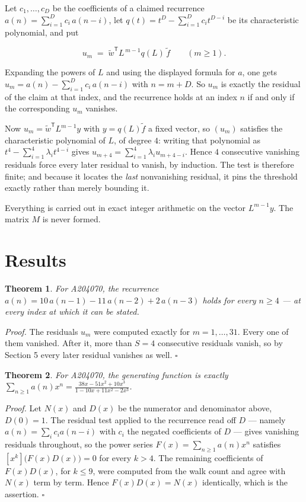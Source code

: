 \documentclass[11pt]{article}
\newtheorem{theorem}{Theorem}
\theoremstyle{definition}
\begin{document}
Let $c_1,\dots,c_D$ be the coefficients of a claimed recurrence $a(n) = \sum_{i=1}^{D} c_i\,a(n-i)$, let $q(t) = t^{D} - \sum_{i=1}^{D} c_i t^{D-i}$ be its characteristic polynomial, and put

\[u_m \;=\; \tilde w^{\mathsf T} L^{\,m-1} q(L)\,\tilde f \qquad (m \ge 1).\]

Expanding the powers of $L$ and using the displayed formula for $a$, one gets $u_m = a(n) - \sum_{i=1}^{D} c_i\,a(n-i)$ with $n = m + D$. So $u_m$ is exactly the residual of the claim at that index, and the recurrence holds at an index $n$ if and only if the corresponding $u_m$ vanishes.

Now $u_m = \tilde w^{\mathsf T} L^{m-1} y$ with $y = q(L)\tilde f$ a fixed vector, so $(u_m)$ satisfies the characteristic polynomial of $L$, of degree $4$: writing that polynomial as $t^{4} - \sum_{i=1}^{4} \lambda_i t^{4-i}$ gives $u_{m+4} = \sum_{i=1}^{4} \lambda_i u_{m+4-i}$. Hence $4$ consecutive vanishing residuals force every later residual to vanish, by induction. The test is therefore finite; and because it locates the {\itshape last} nonvanishing residual, it pins the threshold exactly rather than merely bounding it.

Everything is carried out in exact integer arithmetic on the vector $L^{m-1}y$. The matrix $M$ is never formed.

\section{Results}

\begin{theorem} For A204070, the recurrence $a(n) = 10\,a(n-1) - 11\,a(n-2) + 2\,a(n-3)$ holds for every $n \ge 4$ --- at every index at which it can be stated.\end{theorem}

{\itshape Proof.} The residuals $u_m$ were computed exactly for $m = 1,\dots,31$. Every one of them vanished. After it, more than $S = 4$ consecutive residuals vanish, so by Section 5 every later residual vanishes as well. $\square$

\begin{theorem} For A204070, the generating function is exactly $\sum_{n\ge 1} a(n)x^n = \frac{38x - 51x^{2} + 10x^{3}}{1 - 10x + 11x^{2} - 2x^{3}}$.\end{theorem}

{\itshape Proof.} Let $N(x)$ and $D(x)$ be the numerator and denominator above, $D(0)=1$. The residual test applied to the recurrence read off $D$ --- namely $a(n) = \sum_i c_i a(n-i)$ with $c_i$ the negated coefficients of $D$ --- gives vanishing residuals throughout, so the power series $F(x)=\sum_{n\ge 1}a(n)x^n$ satisfies $[x^k]\bigl(F(x)D(x)\bigr) = 0$ for every $k > 4$. The remaining coefficients of $F(x)D(x)$, for $k \le 9$, were computed from the walk count and agree with $N(x)$ term by term. Hence $F(x)D(x) = N(x)$ identically, which is the assertion. $\square$
\end{document}
